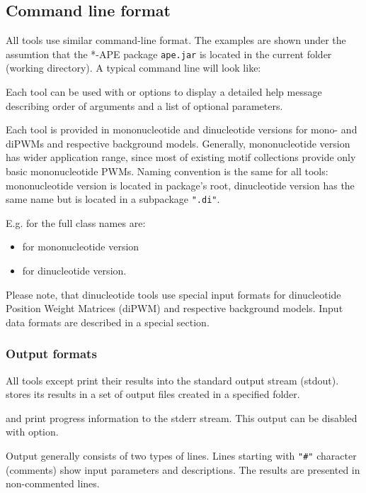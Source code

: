 \subsection{Command line format}
All tools use similar command-line format. The examples are shown under the assumtion that the *-APE package \texttt{ape.jar} is located in the current folder (working directory). A typical command line will look like:\par
\texttt{}

Each tool can be used with  or  options to display a detailed help message describing order of arguments and a list of optional parameters.

Each tool is provided in mononucleotide and dinucleotide versions for mono- and diPWMs and respective background models.
Generally, mononucleotide version has wider application range, since most of existing motif collections provide only basic mononucleotide PWMs.
Naming convention is the same for all tools: mononucleotide version is located in package's root, dinucleotide version has the same name but is located in a subpackage \texttt{".di"}.

E.g. for  the full class names are:
\begin{itemize}
\item{} for mononucleotide version
\item{} for dinucleotide version.
\end{itemize}

Please note, that dinucleotide tools use special input formats for dinucleotide Position Weight Matrices (diPWM) and respective background models. Input data formats are described in a special section.


\subsubsection{Output formats}

All tools except  print their results into the standard output stream (stdout).
 stores its results in a set of output files created in a specified folder.

 and  print progress information to the stderr stream. This output can be disabled with  option.

Output generally consists of two types of lines. Lines starting with \texttt{"\#"} character (comments) show
input parameters and descriptions. The results are presented in non-commented lines.
